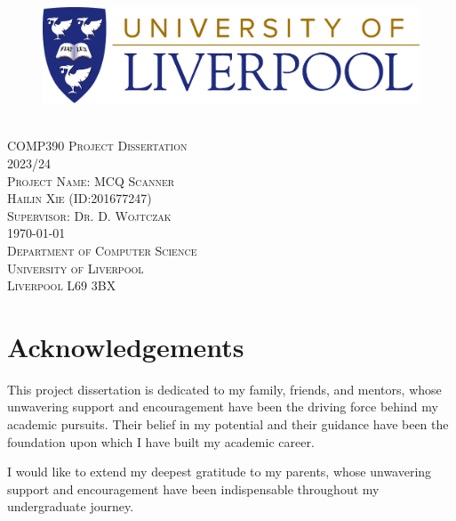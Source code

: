 \documentclass[twocolumn]{article}
\begin{document}
\begin{titlepage}
    \begin{center}
        \begin{figure}[h]
            \centering
            \includegraphics[scale = 0.15]{liverpool logo.png}
        \end{figure}
        \textsc{\\[2.5cm]\Huge COMP390 Project Dissertation\\[0.5cm]}
        \textsc{\LARGE 2023/24\\[2cm]}
        \textsc{\huge Project Name: MCQ Scanner\\[1cm]}
        \textsc{\Large Hailin Xie (ID:201677247)\\[0.5cm]}
        \textsc{\Large Supervisor: Dr. D. Wojtczak\\[0.5cm]}
        \textsc{\Large {\today}\\[6cm]}
        \textsc{\Large Department of Computer Science\\[0.5cm]}
        \textsc{\Large University of Liverpool\\[0.5cm]}
        \textsc{\Large Liverpool L69 3BX\\[0.5cm]}

    \end{center}
\end{titlepage}

\section*{Acknowledgements}
        \noindent

        This project dissertation is dedicated to my family, friends, and mentors, whose unwavering support and encouragement have been the driving force behind my academic pursuits. Their belief in my potential and their guidance have been the foundation upon which I have built my academic career. 

        I would like to extend my deepest gratitude to my parents, whose unwavering support and encouragement have been indispensable throughout my undergraduate journey.
\end{document}
